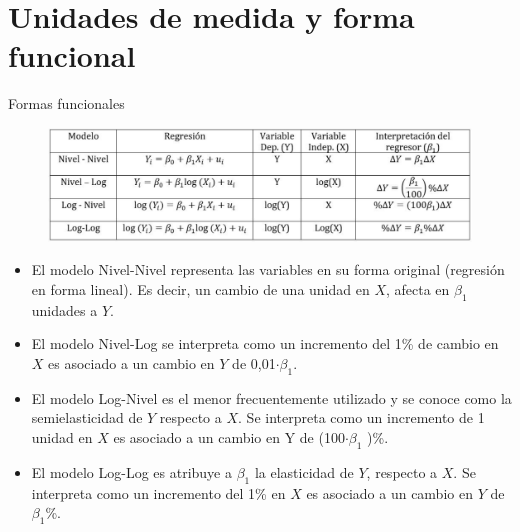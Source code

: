 \section{Unidades de medida y forma funcional}
\begin{frame}{Formas funcionales}
	\begin{figure}
		\centering
		\includegraphics[width=0.9\linewidth]{fig/form_fun.png}
	\end{figure}
	\begin{itemize}
		\item El modelo Nivel-Nivel representa las variables en su forma original (regresión en forma lineal). Es decir, un cambio de una unidad en $X$, afecta en $\beta_1$ unidades a $Y$.
		\item El modelo Nivel-Log se interpreta como un incremento del 1\% de cambio en $X$ es asociado a un cambio en $Y$ de 0,01$\cdot\beta_1$.
		\item El modelo Log-Nivel es el menor frecuentemente utilizado y se conoce como la semielasticidad de $Y$ respecto a $X$. Se interpreta como un incremento de 1 unidad en $X$ es asociado a un cambio en Y de (100$\cdot\beta_1$ )\%.
		\item El modelo Log-Log es atribuye a $\beta_1$ la elasticidad de $Y$, respecto a $X$. Se interpreta como un incremento del 1\% en $X$ es asociado a un cambio en $Y$ de $\beta_1$\%.
	\end{itemize}
\end{frame}